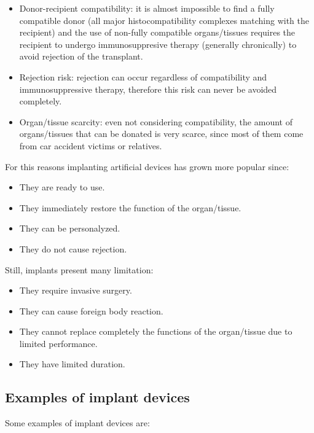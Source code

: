 \begin{multicols}{2}
  \begin{itemize}
    \item Donor-recipient compatibility: it is almost impossible to find a fully compatible donor (all major histocompatibility complexes matching with the recipient) and the use of non-fully compatible organs/tissues requires the recipient to undergo immunosuppresive therapy (generally chronically) to avoid rejection of the transplant.
    \item Rejection risk: rejection can occur regardless of compatibility and immunosuppressive therapy, therefore this risk can never be avoided completely.
    \item Organ/tissue scarcity: even not considering compatibility, the amount of organs/tissues that can be donated is very scarce, since most of them come from car accident victims or relatives.
  \end{itemize}
\end{multicols}

For this reasons implanting artificial devices has grown more popular since:

\begin{multicols}{2}
  \begin{itemize}
    \item They are ready to use.
    \item They immediately restore the function of the organ/tissue.
    \item They can be personalyzed.
    \item They do not cause rejection.
  \end{itemize}
\end{multicols}

Still, implants present many limitation:

\begin{multicols}{2}
  \begin{itemize}
    \item They require invasive surgery.
    \item They can cause foreign body reaction.
    \item They cannot replace completely the functions of the organ/tissue due to limited performance.
    \item They have limited duration.
  \end{itemize}
\end{multicols}

  \subsection{Examples of implant devices}
  Some examples of implant devices are:

